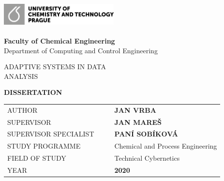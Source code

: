 \cleardoublepage
\thispagestyle{empty}
\thispagestyle{empty}
\noindent
\includegraphics[width=0.45\textwidth]{IMG/TOP/logoUCT_basic_CB.png} \\
\vspace{10mm}
\\
{\Large \textbf{Faculty of Chemical Engineering}
\\ [5mm]
Department of Computing and Control Engineering}

\vspace{40mm}

\begin{spacing}{0.9}
\Huge\noindent ADAPTIVE SYSTEMS IN DATA \\ANALYSIS\\
\end{spacing}

\vspace{30mm}

\noindent
{\Large \textbf{DISSERTATION}} 

\vspace{15mm}

\begin{table}[!h]
\begin{tabular}{  l l |l  l }
\hspace{-0.5em}AUTHOR & \hspace{0mm} & & {\Large \textbf{JAN VRBA}} \\ [7mm]
\hspace{-0.5em}SUPERVISOR &  &  & \textbf{\large JAN MAREŠ}\\ [7mm]
\hspace{-0.5em}SUPERVISOR SPECIALIST    &     &   & {\textbf{\large PANÍ SOBÍKOVÁ}} \\ [7mm]
\hspace{-0.5em}STUDY PROGRAMME &  &  & {\large Chemical and Process Engineering} \\ [7mm]
\hspace{-0.5em}FIELD OF STUDY & &   & {\large Technical Cybernetics}\\ [7mm]
\hspace{-0.5em}YEAR          &       &   & \textbf{2020} \\
\end{tabular}


\end{table}


